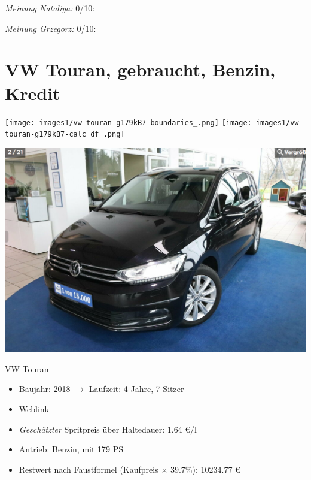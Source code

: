\documentclass[landscape, DIV=99, 14pt]{scrartcl}
\begin{document}
\begin{small}
\emph{Meinung Nataliya:} 0/10: 
        
\emph{Meinung Grzegorz:} 0/10: 
\end{small}

\pagebreak


\twocolumn

\section*{VW Touran, gebraucht, Benzin, Kredit}
\begin{center}
\texttt{[image: images1/vw-touran-g179kB7-boundaries\_.png]}
\null
\vspace{0.5cm}
\texttt{[image: images1/vw-touran-g179kB7-calc\_df\_.png]}
\end{center}

\pagebreak
\begin{center}
\includegraphics[width=0.9\columnwidth]{cars/vw-touran-geb2.png}

VW Touran
\end{center}

\begin{itemize}
    \item Baujahr: 2018 $\rightarrow$ Laufzeit: 4 Jahre, 7-Sitzer
    \item \href{https://suchen.mobile.de/fahrzeuge/details.html?id=337573342}{Weblink}
    \item \emph{Gesch\"atzter} Spritpreis \"uber Haltedauer: 1.64 \euro{}/l
    \item Antrieb: Benzin, mit 179 PS
    \item Restwert nach Faustformel (Kaufpreis $\times$ 39.7\%): 10234.77 \euro{}
\end{itemize}
\end{document}
